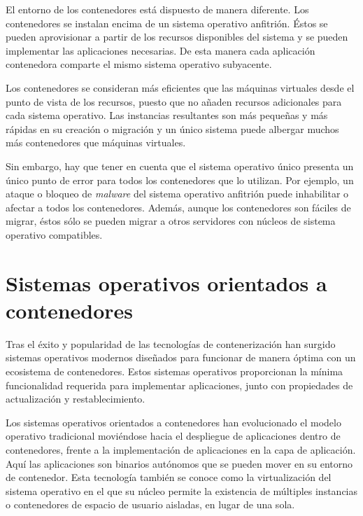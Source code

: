 El entorno de los contenedores está dispuesto de manera diferente. Los contenedores se instalan encima de un sistema operativo anfitrión. Éstos se pueden aprovisionar a partir de los recursos disponibles del sistema y se pueden implementar las aplicaciones necesarias. De esta manera cada aplicación contenedora comparte el mismo sistema operativo subyacente.

Los contenedores se consideran más eficientes que las máquinas virtuales desde el punto de vista de los recursos, puesto que no añaden recursos adicionales para cada sistema operativo. Las instancias resultantes son más pequeñas y más rápidas en su creación o migración y un único sistema puede albergar muchos más contenedores que máquinas virtuales.

Sin embargo, hay que tener en cuenta que el sistema operativo único presenta un único punto de error para todos los contenedores que lo utilizan. Por ejemplo, un ataque o bloqueo de \textit{malware} del sistema operativo anfitrión puede inhabilitar o afectar a todos los contenedores. Además, aunque los contenedores son fáciles de migrar, éstos sólo se pueden migrar a otros servidores con núcleos de sistema operativo compatibles.


\section{Sistemas operativos orientados a contenedores}

Tras el éxito y popularidad de las tecnologías de contenerización han surgido sistemas operativos modernos diseñados para funcionar de manera óptima con un ecosistema de contenedores. Estos sistemas operativos proporcionan la mínima funcionalidad requerida para implementar aplicaciones, junto con propiedades de actualización y restablecimiento.

Los sistemas operativos orientados a contenedores han evolucionado el modelo operativo tradicional moviéndose hacia el despliegue de aplicaciones dentro de contenedores, frente a la implementación de aplicaciones en la capa de aplicación. Aquí las aplicaciones son binarios autónomos que se pueden mover en su entorno de contenedor. Esta tecnología también se conoce como la virtualización del sistema operativo en el que su núcleo permite la existencia de múltiples instancias o contenedores de espacio de usuario aisladas, en lugar de una sola.

